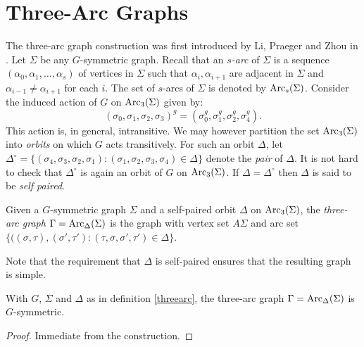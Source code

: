 
\section{Three-Arc Graphs}
The three-arc graph construction was first introduced 
by Li, Praeger and Zhou in \cite{ZCP2000}.
Let $\Sigma$ be any $G$-symmetric graph.
Recall that an {\it $s$-arc} of $\Sigma$ is a sequence 
$(\alpha_0, \alpha_1, \dots, \alpha_s)$ of vertices in $\Sigma$ such that 
$\alpha_i,\alpha_{i+1}$ are adjacent in $\Sigma$ and $\alpha_{i-1} \neq \alpha_{i+1}$
for each $i$. The set of $s$-arcs of $\Sigma$ is denoted by $\operatorname{Arc}_s(\Sigma)$.
Consider the induced action of $G$ on $\operatorname{Arc}_3(\Sigma)$ given by:
$$(\sigma_0,\sigma_1,\sigma_2,\sigma_3)^g = (\sigma_0^g,\sigma_1^g,\sigma_2^g,\sigma_4^g).$$
This action is, in general, intransitive. We may however partition the set $\operatorname{Arc}_3(\Sigma)$
into {\it orbits} on which $G$ acts transitively. For such an orbit $\Delta$, let 
$\Delta^{\circ} = \{ (\sigma_4, \sigma_3, \sigma_2, \sigma_1) : 
                 (\sigma_1, \sigma_2, \sigma_3, \sigma_4) \in \Delta \}$ 
denote the {\it pair} of $\Delta$. It is not hard to check that
$\Delta^{\circ}$ is again an orbit of $G$ on $\operatorname{Arc}_3(\Sigma)$.
If $\Delta = \Delta^{\circ}$ then $\Delta$ is said to be {\it self paired}.

\begin{definition}
\label{threearc}
Given a $G$-symmetric graph $\Sigma$ and a self-paired orbit $\Delta$ on 
$\operatorname{Arc}_3(\Sigma)$, the {\it three-arc graph}
$\Gamma = \operatorname{Arc}_{\Delta}(\Sigma)$ is the graph with vertex set $A \Sigma$
and arc set $\{ ((\sigma,\tau), (\sigma',\tau') : (\tau,\sigma,\sigma',\tau') \in \Delta \}$.
\end{definition}

Note that the requirement that $\Delta$ is self-paired 
ensures that the resulting graph is simple.

\begin{proposition}
With $G$, $\Sigma$ and $\Delta$ as in definition \ref{threearc},
the three-arc graph $\Gamma = \operatorname{Arc}_{\Delta}(\Sigma)$
is $G$-symmetric.
\begin{proof} Immediate from the construction.
\end{proof} 
\end{proposition}


